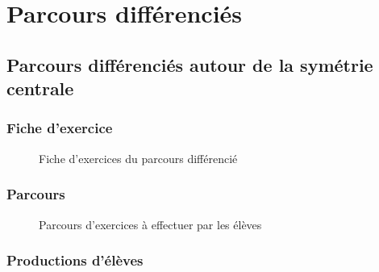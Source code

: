 \section{Parcours différenciés}
\subsection{Parcours différenciés autour de la symétrie centrale}
\subsubsection*{Fiche d'exercice}\label{parcours_symetrie_centrale}
\begin{figure}[!h]
	\caption{Fiche d'exercices du parcours différencié}
\end{figure}
\subsubsection*{Parcours}
\begin{figure}[!h]
	\caption{Parcours d'exercices à effectuer par les élèves}
\end{figure}
\subsubsection*{Productions d'élèves}\label{Prod_eleves_ju}
